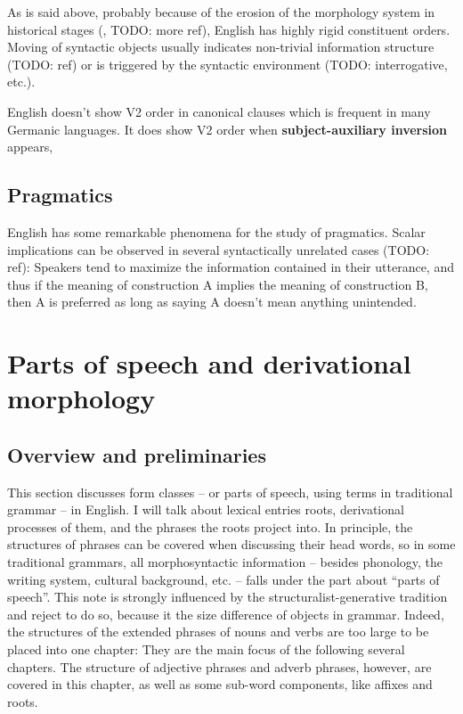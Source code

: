 \documentclass[UTF8, a4paper, oneside, scheme=plain]{ctexrep}
\newcommand*{\concept}[1]{\textbf{#1}}
\begin{document}
As is said above, probably because of the erosion of the morphology system in historical stages
(, TODO: more ref),
English has highly rigid constituent orders. 
Moving of syntactic objects usually indicates 
non-trivial information structure (TODO: ref) 
or is triggered by the syntactic environment (TODO: interrogative, etc.).

English doesn't show V2 order in canonical clauses which is frequent in many Germanic languages.
It does show V2 order when \concept{subject-auxiliary inversion} appears,

\section{Pragmatics}

English has some remarkable phenomena for the study of pragmatics.
Scalar implications can be observed in several syntactically unrelated cases (TODO: ref):
Speakers tend to maximize the information contained in their utterance,
and thus if the meaning of construction A implies 
the meaning of construction B,
then A is preferred as long as saying A doesn't mean anything unintended.

\chapter{Parts of speech and derivational morphology}\label{chap:pos}

\section{Overview and preliminaries}\label{sec:nouns.overview}

This section discusses form classes -- or parts of speech, using terms in traditional grammar -- in English.
I will talk about lexical entries roots, derivational processes of them,  
and the phrases the roots project into.
In principle, the structures of phrases can be covered when discussing their head words,
so in some traditional grammars,
all morphosyntactic information -- besides phonology, the writing system, cultural background, etc. -- 
falls under the part about ``parts of speech''.
This note is strongly influenced by the structuralist-generative tradition
and reject to do so, 
because it the size difference of objects in grammar.
Indeed, the structures of the extended phrases of nouns and verbs are too large 
to be placed into one chapter:
They are the main focus of the following several chapters.
The structure of adjective phrases and adverb phrases, however, are covered in this chapter,
as well as some sub-word components, like affixes and roots.
\end{document}

